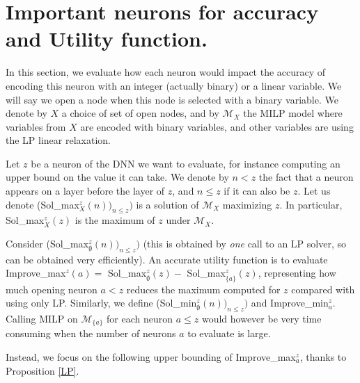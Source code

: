 \section{Important neurons for accuracy and Utility function.}

In this section, we evaluate how each neuron would impact the accuracy of encoding this neuron with an integer (actually binary) or a linear variable. We will say we open a node when this node is selected with a binary variable. We denote by $X$ a choice of set of open nodes, and by $\mathcal{M}_X$ the MILP model where variables from $X$ are encoded with binary variables, and other variables are using the LP linear relaxation.

Let $z$ be a neuron of the DNN we want to evaluate, for instance computing an upper bound on the value it can take. We denote by $n< z$ the fact that a neuron appears on a layer before the layer of $z$, and $n \leq z$ if it can also be $z$.
Let us denote (Sol\_max$_X^z(n))_{n \leq z})$ is a solution of $\mathcal{M}_X$ 
maximizing $z$. In particular, Sol\_max$_X^z(z)$ is the maximum of $z$ under $\mathcal{M}_X$.

Consider (Sol\_max$_\emptyset^z(n))_{n \leq z})$ (this is obtained by {\em one} call to an LP solver, so can be obtained very efficiently).
An accurate utility function is to evaluate 
Improve\_max$^z(a)=$ Sol\_max$_\emptyset^z(z) -$ Sol\_max$_{\{a\}}^z(z)$, 
representing how much opening neuron $a < z$ reduces the maximum computed for $z$
compared with using only LP. 
Similarly, we define (Sol\_min$_\emptyset^z(n))_{n \leq z})$ and 
Improve\_min$_a^z$. Calling MILP on $\mathcal{M}_{\{a\}}$ for each neuron $a \leq z$
would however be very time consuming when the number of neurons $a$ to evaluate is large.

Instead, we focus on the following upper bounding of Improve\_max$_a^z$, thanks to Proposition \ref{LP}.








